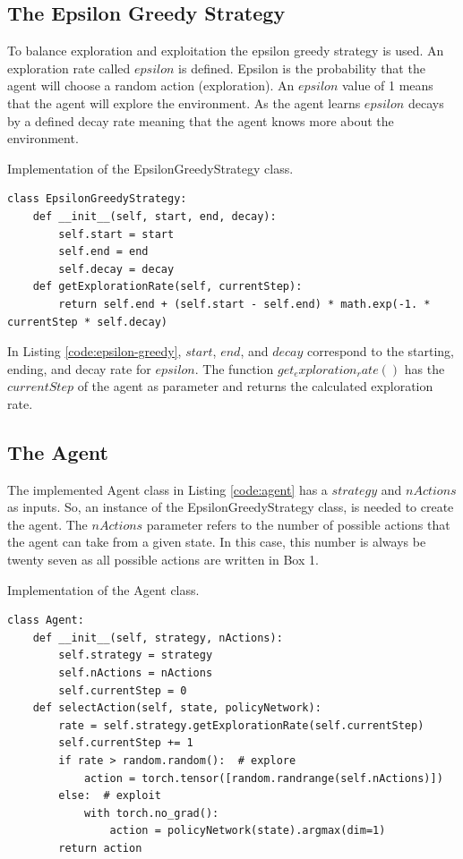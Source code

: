 \documentclass[12pt,oneside]{article}
\begin{document}
\subsection{The Epsilon Greedy Strategy}
To balance exploration and exploitation the epsilon greedy strategy is used. An exploration rate called $epsilon$ is defined. Epsilon is the probability that the agent will choose a random action (exploration). An $epsilon$ value of 1 means that the agent will explore the environment. As the agent learns $epsilon$ decays by a defined decay rate meaning that the agent knows more about the environment.
\begin{listing}[H]
\caption{Implementation of the EpsilonGreedyStrategy class.}
\label{code:epsilon-greedy}
\begin{verbatim}
class EpsilonGreedyStrategy:
    def __init__(self, start, end, decay):
        self.start = start
        self.end = end
        self.decay = decay
    def getExplorationRate(self, currentStep):
        return self.end + (self.start - self.end) * math.exp(-1. * currentStep * self.decay)
\end{verbatim}
\end{listing} 
In Listing \ref{code:epsilon-greedy}, $start$, $end$, and $decay$ correspond to the starting, ending, and decay rate for $epsilon$. The function $get_exploration_rate()$ has the $currentStep$ of the agent as parameter and returns the calculated exploration rate.

\subsection{The Agent}
The implemented Agent class in Listing \ref{code:agent} has a $strategy$ and $nActions$ as inputs. So, an instance of the EpsilonGreedyStrategy class, is needed to create the agent. The $nActions$ parameter refers to the number of possible actions that the agent can take from a given state. In this case, this number is always be twenty seven as all possible actions are written in Box 1.

\begin{listing}[H]
\caption{Implementation of the Agent class.}
\label{code:agent}
\begin{verbatim}
class Agent:
    def __init__(self, strategy, nActions):
        self.strategy = strategy
        self.nActions = nActions
        self.currentStep = 0
    def selectAction(self, state, policyNetwork):
        rate = self.strategy.getExplorationRate(self.currentStep)
        self.currentStep += 1
        if rate > random.random():  # explore
            action = torch.tensor([random.randrange(self.nActions)])
        else:  # exploit
        	with torch.no_grad():
            	action = policyNetwork(state).argmax(dim=1)
        return action
\end{verbatim}
\end{listing} 
\end{document}
